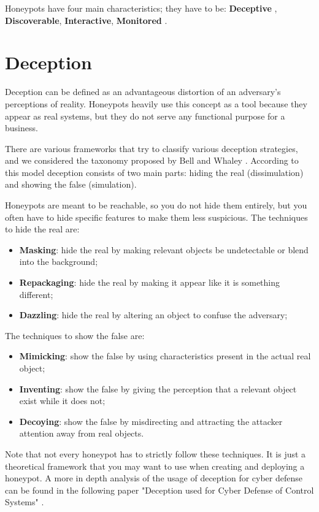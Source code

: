 \documentclass[epsfig,a4paper,11pt,titlepage,oneside,openany]{book}
\begin{document}
Honeypots have four main characteristics; they have to be: \textbf{Deceptive} , \textbf{Discoverable}, \textbf{Interactive}, \textbf{Monitored} \cite{sanders2020intrusion}.

\section{Deception}

Deception can be defined as an advantageous distortion of an adversary's perceptions of reality. Honeypots heavily use this concept as a tool because they appear as real systems, but they do not serve any functional purpose for a business.

There are various frameworks that try to classify various deception strategies, and we considered the taxonomy proposed by Bell and Whaley \cite{Whaley}. According to this model deception consists of two main parts: hiding the real (dissimulation) and showing the false (simulation).

Honeypots are meant to be reachable, so you do not hide them entirely, but you often have to hide specific features to make them less suspicious.
The techniques to hide the real are:
\begin{itemize}
\itemsep0em 
\item \textbf{Masking}: hide the  real by making relevant objects be undetectable or blend into the background;
\item \textbf{Repackaging}: hide the  real by making it appear like it is something different;
\item \textbf{Dazzling}: hide the real by altering an object to confuse the adversary;
\end{itemize}

The techniques to show the false are:
\begin{itemize}
\itemsep0em 
\item \textbf{Mimicking}: show the false by using characteristics present in the actual real object;
\item \textbf{Inventing}: show the false by giving the perception that a relevant object exist while it does not; 
\item \textbf{Decoying}: show the false by misdirecting and attracting the attacker attention away from real objects.
\end{itemize}
Note that not every honeypot has to strictly follow these techniques. It is just a theoretical framework that you may want to use when creating and deploying a honeypot. 
A more in depth analysis of the usage of deception for cyber defense can be found in the following paper "Deception used for Cyber Defense of  Control Systems" \cite{deception_defense}.
\end{document}
